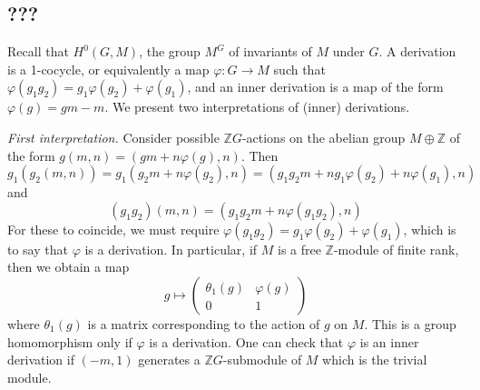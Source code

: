 \subsection{???}
Recall that \( H^0(G, M) \), the group \( M^G \) of invariants of \( M \) under \( G \).
A derivation is a 1-cocycle, or equivalently a map \( \varphi : G \to M \) such that \( \varphi(g_1 g_2) = g_1 \varphi(g_2) + \varphi(g_1) \), and an inner derivation is a map of the form \( \varphi(g) = gm - m \).
We present two interpretations of (inner) derivations.

\emph{First interpretation.}
Consider possible \( \mathbb Z G \)-actions on the abelian group \( M \oplus \mathbb Z \) of the form \( g(m, n) = (gm + n \varphi(g), n) \).
Then
\[ g_1(g_2(m, n)) = g_1(g_2 m + n \varphi(g_2), n) = (g_1 g_2 m + n g_1 \varphi(g_2) + n \varphi(g_1), n) \]
and
\[ (g_1 g_2)(m, n) = (g_1 g_2 m + n \varphi(g_1 g_2), n) \]
For these to coincide, we must require \( \varphi(g_1 g_2) = g_1 \varphi(g_2) + \varphi(g_1) \), which is to say that \( \varphi \) is a derivation.
In particular, if \( M \) is a free \( \mathbb Z \)-module of finite rank, then we obtain a map
\[ g \mapsto \begin{pmatrix}
    \theta_1(g) & \varphi(g) \\
    0 & 1
\end{pmatrix} \]
where \( \theta_1(g) \) is a matrix corresponding to the action of \( g \) on \( M \).
This is a group homomorphism only if \( \varphi \) is a derivation.
One can check that \( \varphi \) is an inner derivation if \( (-m, 1) \) generates a \( \mathbb Z G \)-submodule of \( M \) which is the trivial module.
